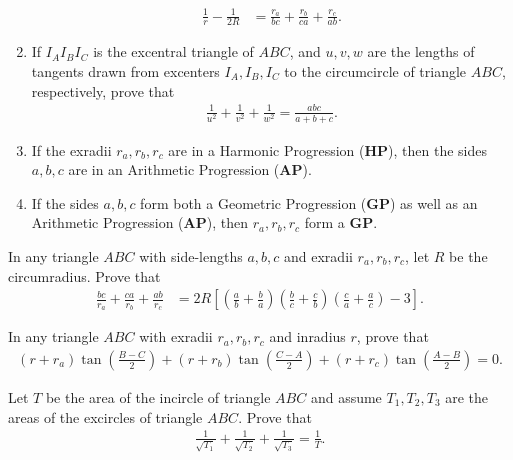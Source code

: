 \documentclass[12pt,a4paper]{memoir}
\theoremstyle{definition}
\begin{document}
\begin{question}[name={Makshud's Excentral Identities}]
\begin{enumerate}
\begin{align*}
				\frac{1}{r} - \frac{1}{2R} &= \frac{r_a}{bc}+ \frac{r_b}{ca}+\frac{r_c}{ab}.
			\end{align*}
			\item If $I_AI_BI_C$ is the excentral triangle of $ABC$, and $u,v,w$ are the lengths of tangents drawn from excenters $I_A,I_B,I_C$ to the circumcircle of triangle $ABC$, respectively, prove that
			\begin{align*}
				\frac{1}{u^2}+\frac{1}{v^2}+\frac{1}{w^2}=\frac{abc}{a+b+c}.
			\end{align*}
			\item If the exradii $r_a,r_b,r_c$ are in a Harmonic Progression (\textbf{HP}), then the sides $a,b,c$ are in an Arithmetic Progression (\textbf{AP}).
			\item If the sides $a,b,c$ form both a Geometric Progression (\textbf{GP}) as well as an Arithmetic Progression (\textbf{AP}), then $r_a,r_b,r_c$ form a \textbf{GP}.
		\end{enumerate}
	\end{question}



\begin{question}
	In any triangle $ABC$ with side-lengths $a,b,c$ and exradii $r_a,r_b,r_c$, let $R$ be the circumradius. Prove that
	\begin{align*}
		\frac{bc}{r_a}+\frac{ca}{r_b}+\frac{ab}{r_c} &= 2R\left[\left( \frac ab+ \frac ba\right)\left( \frac bc+ \frac cb\right)\left( \frac ca+ \frac ac\right)-3\right].
	\end{align*}
\end{question}

\begin{question}
	In any triangle $ABC$ with exradii $r_a,r_b,r_c$ and inradius $r$, prove that
	\begin{align*}
		(r+r_a)\tan\left(\frac{B-C}{2}\right)+(r+r_b)\tan\left(\frac{C-A}{2}\right)+(r+r_c)\tan\left(\frac{A-B}{2}\right)=0.
	\end{align*}
\end{question}

\begin{question}
	Let $T$ be the area of the incircle of triangle $ABC$ and assume $T_1,T_2,T_3$ are the areas of the excircles of triangle $ABC$. Prove that
	\begin{align*}
		\frac{1}{\sqrt{T_1}}+\frac{1}{\sqrt{T_2}}+\frac{1}{\sqrt{T_3}}=\frac{1}{T}.
	\end{align*}
\end{question}
\end{document}
